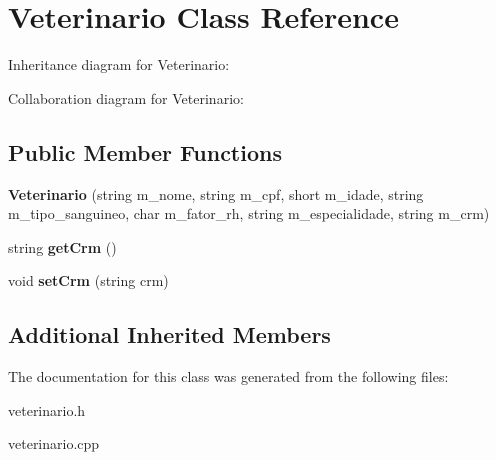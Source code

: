 \hypertarget{classVeterinario}{}\section{Veterinario Class Reference}
\label{classVeterinario}


Inheritance diagram for Veterinario\+:


Collaboration diagram for Veterinario\+:
\subsection*{Public Member Functions}
\begin{DoxyCompactItemize}
\item 
\mbox{\label{classVeterinario_acb3e33b730a2d11bff462817b274cce3}} 
{\bfseries Veterinario} (string m\+\_\+nome, string m\+\_\+cpf, short m\+\_\+idade, string m\+\_\+tipo\+\_\+sanguineo, char m\+\_\+fator\+\_\+rh, string m\+\_\+especialidade, string m\+\_\+crm)
\item 
\mbox{\label{classVeterinario_aa8d14192611e2598119292d794918bac}} 
string {\bfseries get\+Crm} ()
\item 
\mbox{\label{classVeterinario_a4d936319d7de63fc6d168b72603b145c}} 
void {\bfseries set\+Crm} (string crm)
\end{DoxyCompactItemize}
\subsection*{Additional Inherited Members}


The documentation for this class was generated from the following files\+:\begin{DoxyCompactItemize}
\item 
veterinario.\+h\item 
veterinario.\+cpp\end{DoxyCompactItemize}
